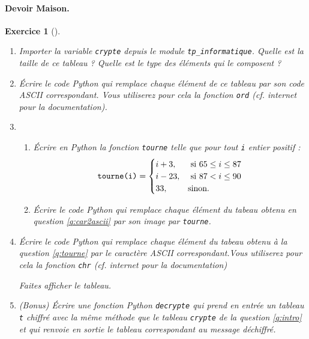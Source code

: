 \documentclass[12pt]{article}                   %
\newcounter{exoscount}
\theoremstyle{exercicestyle}
\newtheorem{exos}[exoscount]{Exercice}
\newenvironment{exo}[2]
  {
   \begin{exos}[#1]
   \leavevmode
   \marginpar{\hfill $#2 $ }}
  {\end{exos}}
\theoremstyle{break2}
\theoremstyle{break3}
\begin{document}
\pagebreak

\paragraph{Devoir Maison.}

\begin{exo}{}{  }
    \begin{enumerate}
        \item Importer la variable \texttt{crypte} depuis le module \texttt{tp\_informatique}. Quelle est la taille de ce tableau ? Quelle est le type des éléments qui le composent ?
            \label{q:intro}
        \item \label{q:car2ascii} Écrire le code Python qui remplace chaque élément de ce tableau par son code ASCII correspondant. Vous utiliserez pour cela la fonction \texttt{ord} (cf. internet pour la documentation).
        \item \begin{enumerate}
            \item Écrire en Python la fonction \texttt{tourne} telle que pour tout \texttt{i} entier positif :
                $$ 
                \text{\texttt{tourne(i)}} =
                \begin{cases}
                    i + 3, &\text{ si } 65 \leq i \leq 87 \\
                    i - 23, &\text{ si } 87 < i \leq 90 \\
                    33, &\text{sinon.}
                \end{cases}
                $$
            \item Écrire le code Python qui remplace chaque élément du tabeau obtenu en question \ref{q:car2ascii} par son image par \texttt{tourne}.
                \label{q:tourne}
        \end{enumerate}
    \item Écrire le code Python qui remplace chaque élément du tabeau obtenu à la question \ref{q:tourne} par le caractère ASCII correspondant.Vous utiliserez pour cela la fonction \texttt{chr} (cf. internet pour la documentation)

        Faites afficher le tableau. 
    \item (Bonus) Écrire une fonction Python \texttt{decrypte} qui prend en entrée un tableau \texttt{t} chiffré avec la même méthode que le tableau \texttt{crypte} de la question \ref{q:intro} et qui renvoie en sortie le tableau correspondant au message déchiffré. 
    \end{enumerate}
\end{exo} 
\end{document}
